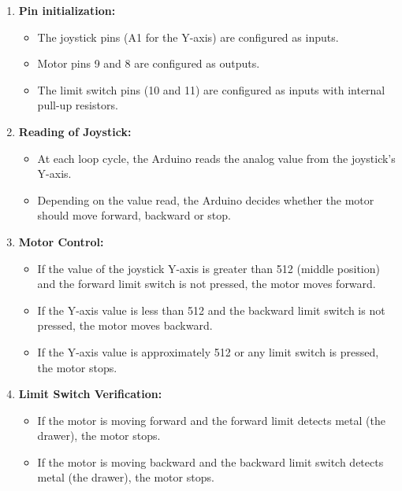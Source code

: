     \begin{enumerate}
        \item \textbf{Pin initialization:}
        \begin{itemize}
            \item The joystick pins (A1 for the Y-axis) are configured as inputs.
            \item Motor pins 9 and 8 are configured as outputs.
            \item The limit switch pins (10 and 11) are configured as inputs with internal pull-up resistors.
        \end{itemize}
        \item \textbf{Reading of Joystick:}
        \begin{itemize}
            \item At each loop cycle, the Arduino reads the analog value from the joystick's Y-axis.
            \item Depending on the value read, the Arduino decides whether the motor should move forward, backward or stop.
        \end{itemize}
        \item \textbf{Motor Control:}
        \begin{itemize}
            \item If the value of the joystick Y-axis is greater than 512 (middle position) and the forward limit switch is not pressed, the motor moves forward.
            \item If the Y-axis value is less than 512 and the backward limit switch is not pressed, the motor moves backward.
            \item If the Y-axis value is approximately 512 or any limit switch is pressed, the motor stops.
        \end{itemize}
        \item \textbf{Limit Switch Verification:}
        \begin{itemize}
            \item If the motor is moving forward and the forward limit detects  metal (the drawer), the motor stops.
            \item If the motor is moving backward and the backward limit switch detects  metal (the drawer), the motor stops.
    
        \end{itemize}
        
    \end{enumerate}
    
